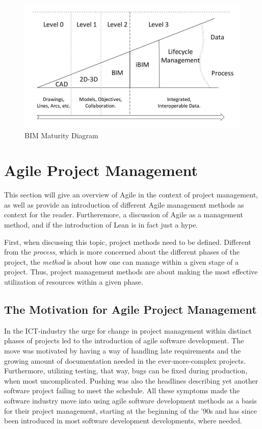 \begin{figure}
    \centering
    \includegraphics[width=\textwidth]{fig/bim-diagram.png}
    \caption{BIM Maturity Diagram \cite{bew2008bim}}
    \label{fig:bim_levels}
\end{figure}


\section{Agile Project Management}
This section will give an overview of Agile in the context of project management, as well as provide an introduction of different Agile management methods as context for the reader. Furtheremore, a discussion of Agile as a management method, and if the introduction of Lean is in fact just a hype. 

First, when discussing this topic, project methods need to be defined. Different from the \textit{process}, which is more concerned about the different phases of the project, the \textit{method} is about how one can manage within a given stage of a project. Thus, project management methods are about making the most effective utilization of resources within a given phase. 

\subsection{The Motivation for Agile Project Management}
In the ICT-industry the urge for change in project management within distinct phases of projects led to the introduction of agile software development. The move was motivated by having a way of handling late requirements and the growing amount of documentation needed in the ever-more-complex projects. Furthermore, utilizing testing, that way, bugs can be fixed during production, when most uncomplicated. Pushing was also the headlines describing yet another software project failing to meet the schedule. All these symptoms made the software industry move into using agile software development methods as a basis for their project management, starting at the beginning of the '90s and has since been introduced in most software development developments, where needed.  

